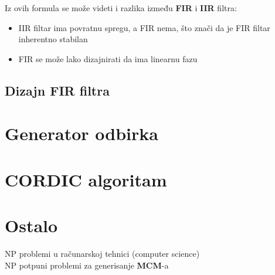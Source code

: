 \documentclass[journal,twocolumn,letterpaper]{IEEEJERM}
\begin{document}
Iz ovih formula se može videti i razlika između \textbf{FIR} i \textbf{IIR} filtra:

\begin{itemize}
	\item IIR filtar ima povratnu spregu, a FIR nema, što znači da je FIR filtar inherentno stabilan
	\item FIR se može lako dizajnirati da ima linearnu fazu
\end{itemize}


\subsection{Dizajn FIR filtra}

\section{Generator odbirka}


\section{CORDIC algoritam}


\section{Ostalo}

NP problemi u računarskoj tehnici (computer science) \\

NP potpuni problemi za generisanje \textbf{MCM}-a 
\end{document}
